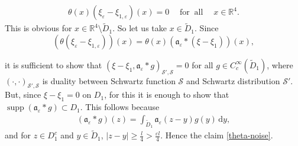\documentclass{article}
\newcommand\dela[1]{}
\newcommand{\mathd}{\mathrm{d}}
\newcommand{\tmop}[1]{\ensuremath{\operatorname{#1}}}
\begin{document}
\begin{equation}
  \begin{array}{l}
    \theta (x) (\xi_{\varepsilon} - \xi_{1, \varepsilon}) (x) = 0 \quad
    \tmop{for} \tmop{all} \quad x \in \mathbb{R}^4 .
  \end{array} \label{theta-noise}
\end{equation}
This is obvious for $x \in \mathbb{R}^4 \setminus \tilde{D}_1$. So let us take
$x \in \tilde{D}_1$. Since 
%
\begin{equation*}
    (\theta (\xi_{\varepsilon} - \xi_{1, \varepsilon})) (x)  =  \theta (x)
   (\mathfrak{a}_{\varepsilon} \ast (\xi - \xi_1)) (x),
\end{equation*}
\dela{\[ \begin{array}{ccc}
     (\theta (\xi_{\varepsilon} - \xi_{1, \varepsilon})) (x) & = & \theta (x)
   \end{array} (\mathfrak{a}_{\varepsilon} \ast (\xi - \xi_1)) (x), \]}
it is sufficient to show that $(\xi - \xi_1, \mathfrak{a}_{\varepsilon} \ast
g)_{\mathcal{S}', \mathcal{S}} = 0$ for all $g \in C_c^{\infty}
(\tilde{D}_1)$, where $(\cdot, \cdot)_{\mathcal{S}', \mathcal{S}}$ is duality
between Schwartz function $\mathcal{S}$ and Schwartz distribution
$\mathcal{S}'$. But, since $\xi - \xi_1 = 0$ on $D_1$, for this it is enough
to show that $\tmop{supp} (\mathfrak{a}_{\varepsilon} \ast g) \subset D_1$.
This follows because
\[ \begin{array}{l}
     (\mathfrak{a}_{\varepsilon} \ast g) (z) = \int_{\tilde{D}_1}
     \mathfrak{a}_{\varepsilon} (z - y) g (y) \, \mathd y,
   \end{array} \]
and for $z \in D_1^c$ and $y \in \tilde{D}_1$, $| z - y | \geqslant
\frac{l}{4} > \frac{\varepsilon l}{4}$. Hence the claim \eqref{theta-noise}.
\end{document}
